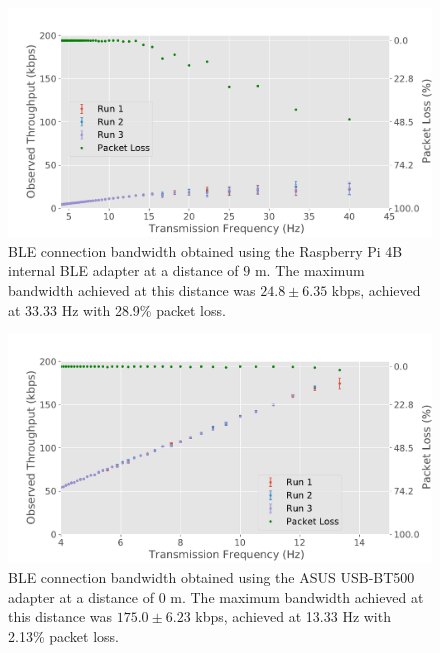\begin{figure}[H]
    \centering
    \includegraphics[width=0.9\linewidth]{images/ble-bandwidth-hci1-900cm.pdf}
    \caption[\acs{BLE} connection bandwidth obtained using the ASUS USB-BT500 adapter at a distance of 9 m.]{\acs{BLE} connection bandwidth obtained using the Raspberry Pi 4B internal \acs{BLE} adapter at a distance of $9\text{ m}$. The maximum bandwidth achieved at this distance was $24.8 \pm 6.35$ kbps, achieved at 33.33 Hz with 28.9\% packet loss.}
    \label{fig:ble-bandwidth-hci1-9m}
\end{figure}

\begin{figure}[H]
    \centering
    \includegraphics[width=0.9\linewidth]{images/ble-bandwidth-hci0-0cm.pdf}
    \caption[\acs{BLE} connection bandwidth obtained using the ASUS USB-BT500 adapter at a distance of 0 m.]{\acs{BLE} connection bandwidth obtained using the ASUS USB-BT500 adapter at a distance of $0\text{ m}$. The maximum bandwidth achieved at this distance was $175.0 \pm 6.23$ kbps, achieved at 13.33 Hz with 2.13\% packet loss.}
    \label{fig:ble-bandwidth-hci0-0m}
\end{figure}

